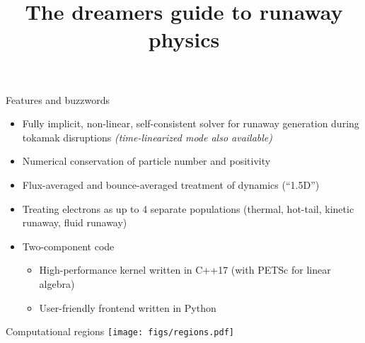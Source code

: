 \documentclass[titleunderline,widescreen1610]{chalmerspresentation}
\title{The dreamers guide to runaway physics}
\begin{document}
    {
        \begin{frame}
            \titlepage
        \end{frame}
    }

    \begin{frame}{Features and buzzwords}
        \begin{itemize}
            \item Fully implicit, non-linear, self-consistent solver for runaway generation during tokamak disruptions \emph{(time-linearized mode also available)}
            \item Numerical conservation of particle number and positivity
            \item Flux-averaged and bounce-averaged treatment of dynamics (``1.5D'')
            \item Treating electrons as up to 4 separate populations (thermal, hot-tail, kinetic runaway, fluid runaway)
            \item Two-component code
            \begin{itemize}
                \item High-performance kernel written in C++17 (with PETSc for linear algebra)
                \item User-friendly frontend written in Python
            \end{itemize}
        \end{itemize}
    \end{frame}

    \begin{frame}{Computational regions}
        \texttt{[image: figs/regions.pdf]}
    \end{frame}
\end{document}
